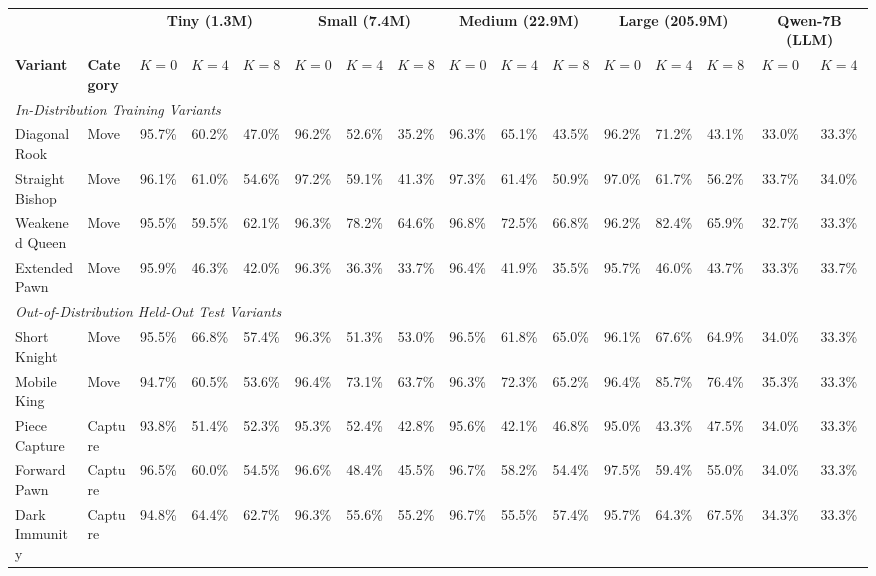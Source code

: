 \begin{table}[t]
\centering
\small
\begin{tabular}{ll|ccc|ccc|ccc|ccc|cc}
\toprule
 & & \multicolumn{3}{c}{\textbf{Tiny (1.3M)}} & \multicolumn{3}{c}{\textbf{Small (7.4M)}} & \multicolumn{3}{c}{\textbf{Medium (22.9M)}} & \multicolumn{3}{c}{\textbf{Large (205.9M)}} & \multicolumn{2}{c}{\textbf{Qwen-7B (LLM)}} \\
\textbf{Variant} & \textbf{Category} & $K=0$ & $K=4$ & $K=8$ & $K=0$ & $K=4$ & $K=8$ & $K=0$ & $K=4$ & $K=8$ & $K=0$ & $K=4$ & $K=8$ & $K=0$ & $K=4$ \\
\midrule
\multicolumn{16}{l}{\textit{In-Distribution Training Variants}} \\
Diagonal Rook      & Move      &  95.7\% &  60.2\% &  47.0\% &  96.2\% &  52.6\% &  35.2\% &  96.3\% &  65.1\% &  43.5\% &  96.2\% &  71.2\% &  43.1\% &  33.0\% &  33.3\% \\
Straight Bishop    & Move      &  96.1\% &  61.0\% &  54.6\% &  97.2\% &  59.1\% &  41.3\% &  97.3\% &  61.4\% &  50.9\% &  97.0\% &  61.7\% &  56.2\% &  33.7\% &  34.0\% \\
Weakened Queen     & Move      &  95.5\% &  59.5\% &  62.1\% &  96.3\% &  78.2\% &  64.6\% &  96.8\% &  72.5\% &  66.8\% &  96.2\% &  82.4\% &  65.9\% &  32.7\% &  33.3\% \\
Extended Pawn      & Move      &  95.9\% &  46.3\% &  42.0\% &  96.3\% &  36.3\% &  33.7\% &  96.4\% &  41.9\% &  35.5\% &  95.7\% &  46.0\% &  43.7\% &  33.3\% &  33.7\% \\
\midrule
\multicolumn{16}{l}{\textit{Out-of-Distribution Held-Out Test Variants}} \\
Short Knight       & Move      &  95.5\% &  66.8\% &  57.4\% &  96.3\% &  51.3\% &  53.0\% &  96.5\% &  61.8\% &  65.0\% &  96.1\% &  67.6\% &  64.9\% &  34.0\% &  33.3\% \\
Mobile King        & Move      &  94.7\% &  60.5\% &  53.6\% &  96.4\% &  73.1\% &  63.7\% &  96.3\% &  72.3\% &  65.2\% &  96.4\% &  85.7\% &  76.4\% &  35.3\% &  33.3\% \\
Piece Capture      & Capture   &  93.8\% &  51.4\% &  52.3\% &  95.3\% &  52.4\% &  42.8\% &  95.6\% &  42.1\% &  46.8\% &  95.0\% &  43.3\% &  47.5\% &  34.0\% &  33.3\% \\
Forward Pawn       & Capture   &  96.5\% &  60.0\% &  54.5\% &  96.6\% &  48.4\% &  45.5\% &  96.7\% &  58.2\% &  54.4\% &  97.5\% &  59.4\% &  55.0\% &  34.0\% &  33.3\% \\
Dark Immunity      & Capture   &  94.8\% &  64.4\% &  62.7\% &  96.3\% &  55.6\% &  55.2\% &  96.7\% &  55.5\% &  57.4\% &  95.7\% &  64.3\% &  67.5\% &  34.3\% &  33.3\% \\

\end{tabular}
\end{table}
